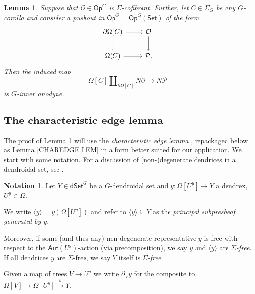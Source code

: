 \documentclass[a4paper,10pt
,draft
]{article}%
\numberwithin{equation}{section}
\numberwithin{figure}{section}
\newtheorem{lemma}[equation]{Lemma}%
\theoremstyle{definition} %
\newtheorem{notation}[equation]{Notation}%
\newcommand{\1}{\ensuremath{\mathbbm 1}}%
\begin{document}
\begin{lemma}\label{KEYPR LEM}
	Suppose that $\mathcal{O} \in \mathsf{Op}^{G}$
	is $\Sigma$-cofibrant.
	Further, let $C \in \Sigma_G$ be any $G$-corolla and consider 
	a pushout in 
	$\mathsf{Op}^{G} = \mathsf{Op}^{G}(\mathsf{Set})$ 
	of the form
	\begin{equation}\label{PUSHOUTPROP EQ}
	\begin{tikzcd}
	\partial \Omega(C) \ar{r} \ar{d} & \mathcal{O} \ar{d}
	\\
	\Omega(C) \ar{r} & \mathcal{P}.
	\end{tikzcd}
	\end{equation}
	Then the induced map
	\begin{equation}\label{ANODYNE MAP}
	\Omega[C] \amalg_{\partial \Omega[C]} N\mathcal{O} \to N\mathcal{P}
	\end{equation}
	is $G$-inner anodyne.
\end{lemma}




\subsection{The characteristic edge lemma}

The proof of Lemma \ref{KEYPR LEM}
will use the \emph{characteristic edge lemma}
\cite[Lemma 3.4]{BP_edss},
repackaged below as 
Lemma \ref{CHAREDGE LEM}
in a form better suited for our application.
We start with some notation.
For a discussion of (non-)degenerate 
dendrices in a dendroidal set,
see \cite[Prop. 5.62]{Per18}.

\begin{notation}
	Let $Y \in \mathsf{dSet}^G$ be a $G$-dendroidal set and 
	$y \colon \Omega[U^y] \to Y$
	a dendrex, $U^y \in \Omega$.
	
	We write $\langle y \rangle = y\left(  \Omega[U^y] \right)$
	and refer to
	$\langle y \rangle \subseteq Y$
	as the \emph{principal subpresheaf generated by $y$}.
	
	Moreover, if some (and thus any)
	non-degenerate representative $y$ is free 
	with respect to the $\mathsf{Aut}(U^y)$-action (via precomposition),
	we say $y$ and $\langle y \rangle$ are \emph{$\Sigma$-free}.
	If all dendrices $y$ are $\Sigma$-free, we say $Y$ itself is \textit{$\Sigma$-free}.
	
	Given a map of trees $V \to U^y$ we write $\partial_V y$ for the composite to $\Omega[V] \to \Omega[U^y] \xrightarrow{y} Y$.
\end{notation}
\end{document}
